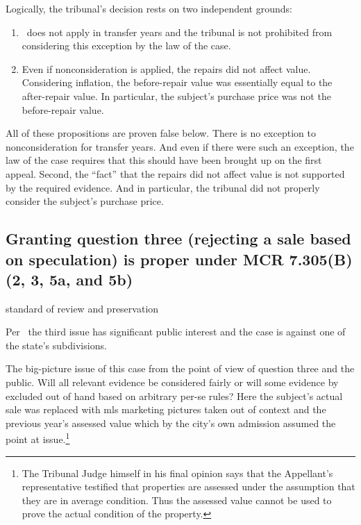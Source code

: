 \documentclass[12pt,\documentclassflag]{michiganCourtOfAppealsBrief}
\begin{document}


Logically, the tribunal's decision rests on two independent grounds:

\begin{enumerate}
\item \mathieuGast\ does not apply in transfer years and the tribunal is not prohibited from considering this exception by the law of the case.
\item Even if nonconsideration is applied, the repairs did not affect value. Considering inflation, the before-repair value was essentially equal to the after-repair value. In particular, the subject's purchase price was not the before-repair value. 
\end{enumerate}

All of these propositions are proven false below. There is no exception to nonconsideration for transfer years. And even if there were such an exception, the law of the case requires that this should have been brought up on the first appeal. Second, the ``fact'' that the repairs did not affect value is not supported by the required evidence. And in particular, the tribunal did not properly consider the subject's purchase price. 


\subsection{Granting question three (rejecting a sale based on speculation) is proper under MCR 7.305(B)(2, 3, 5a, and 5b)}

standard of review and preservation

Per \cite{MCR 7.305(B)(2)}\ the third issue has significant public interest and the case is against one of the state's subdivisions.

The big-picture issue of this case from the point of view of question three and the public. Will all relevant evidence be considered fairly or will some evidence by excluded out of hand based on arbitrary per-se rules? Here the subject's actual sale was replaced with mls marketing pictures taken out of context and the previous year's assessed value which by the city's own admission assumed the point at issue.\footnote{The Tribunal Judge himself in his final opinion says that the Appellant's representative testified that properties are assessed under the assumption that they are in average condition. Thus the assessed value cannot be used to prove the actual condition of the property.}
\end{document}
